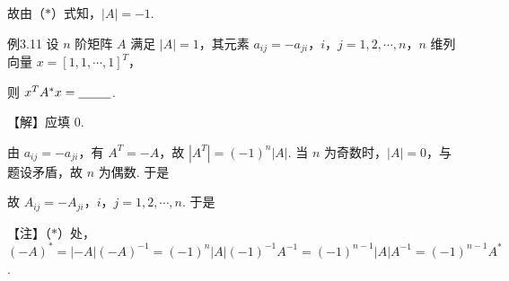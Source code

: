 
故由（$*$）式知，$|A|=-1$.

\begin{fcard}{例3.11}
设 $n$ 阶矩阵 $A$ 满足 $|A|=1$，其元素 $a_{ij}=-a_{ji}$，$i$，$j=1,2,\cdots,n$，$n$ 维列向量 $x=[1,1,\cdots,1]^{T}$，

则 $x^{T}A^*x=\underline{\hspace{2.6em}}$.
\end{fcard}

【解】应填 0.

由 $a_{ij}=-a_{ji}$，有 $A^{T}=-A$，故 $|A^{T}|=(-1)^{n}|A|$. 当 $n$ 为奇数时，$|A|=0$，与题设矛盾，故 $n$ 为偶数. 于是


故 $A_{ij}=-A_{ji}$，$i$，$j=1,2,\cdots,n$. 于是



\begin{fnote}
【注】（$*$）处，$(-A)^*=|-A|(-A)^{-1}=(-1)^{n}|A|(-1)^{-1}A^{-1}=(-1)^{n-1}|A|A^{-1}=(-1)^{n-1}A^*$.
\end{fnote}

